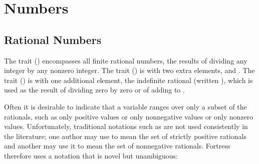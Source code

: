%
%
%
%

\chapter{Numbers}


\section{Rational Numbers}

The trait  () encompasses all finite rational numbers,
the results of dividing any integer by any nonzero integer.
The trait  () is  with
two extra elements, \EXP{+\infty} and \EXP{-\infty}.
The trait  () is  with
one additional element, the indefinite rational (written ), which is used as the result
of dividing zero by zero or of adding \EXP{-\infty} to \EXP{+\infty}.

Often it is desirable to indicate that a variable ranges over only a subset of
the rationals, such as only positive values or only nonnegative values or only
nonzero values.
Unfortunately, traditional notations such as  are not used consistently
in the literature; one author may use  to mean the set of strictly positive rationals
and another may use it to mean the set of nonnegative rationals.
Fortress therefore uses a notation that is novel but unambiguous:

